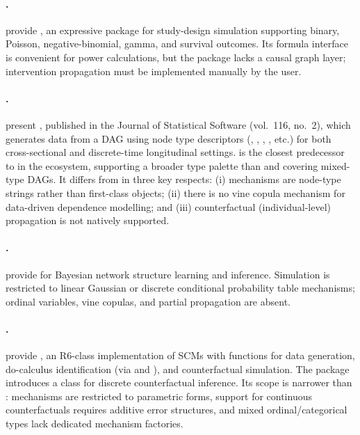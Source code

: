 \documentclass[article]{jss}
\begin{document}
\paragraph{.}
\citet{goldfeld2020simstudy} provide , an expressive 
package for study-design simulation supporting binary, Poisson, negative-binomial,
gamma, and survival outcomes. Its formula interface is convenient for power
calculations, but the package lacks a causal graph layer; intervention propagation
must be implemented manually by the user.

\paragraph{.}
\citet{denz2026simdag} present , published in the Journal of Statistical
Software (vol.~116, no.~2), which generates data from a DAG using node type
descriptors (, , ,
, etc.) for both cross-sectional and discrete-time longitudinal
settings.  is the closest predecessor to  in the
 ecosystem, supporting a broader type palette than  and
covering mixed-type DAGs. It differs from  in three key respects:
(i) mechanisms are node-type strings rather than first-class objects; (ii) there is
no vine copula mechanism for data-driven dependence modelling; and (iii)
counterfactual (individual-level) propagation is not natively supported.

\paragraph{.}
\citet{scutari2010bnlearn} provide  for Bayesian network structure
learning and inference. Simulation is restricted to linear Gaussian or discrete
conditional probability table mechanisms; ordinal variables, vine copulas, and
partial propagation are absent.

\paragraph{.}
\citet{tikka2024r6causal} provide , an R6-class implementation of
SCMs with functions for data generation, do-calculus identification (via
 and ), and counterfactual simulation. The package
introduces a  class for discrete counterfactual inference.
Its scope is narrower than : mechanisms are restricted to
parametric forms, support for continuous counterfactuals requires additive error
structures, and mixed ordinal/categorical types lack dedicated mechanism factories.
\end{document}
